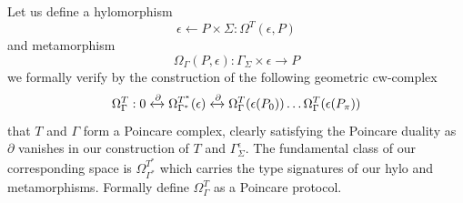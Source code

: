 \documentclass[runningheads]{llncs}
\begin{document}
Let us define a hylomorphism
\begin{equation}
\epsilon \leftarrow P \times \Sigma  : \Omega^T(\epsilon, P)
\end{equation}
and metamorphism
\begin{equation}
\Omega_\Gamma(P, \epsilon):\Gamma_\Sigma \times \epsilon \rightarrow P  
\end{equation} 
we formally verify by the construction of the following geometric cw-complex
\begin{equation}
\Omega^T_\Gamma: 0 \xleftrightarrow{\partial} \Omega^{T^*}_{\Gamma^*}(\epsilon) \xleftrightarrow{\partial} \Omega^T_\Gamma (\epsilon(P_0)) \dots \Omega^T_\Gamma (\epsilon(P_\pi))
\end{equation}
that $T$ and $\Gamma$ form a Poincare complex, clearly satisfying the Poincare duality as $\partial$ vanishes in our construction of $T$ and $\Gamma^\epsilon_\Sigma$. The fundamental class of our corresponding space is $\Omega^{T^*}_{\Gamma^*}$ which carries the type signatures of our hylo and metamorphisms. Formally define $\Omega^{T}_{\Gamma}$ as a Poincare protocol.
\end{document}
